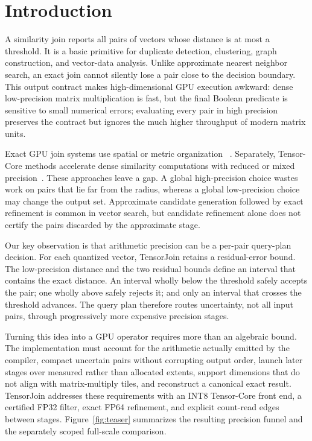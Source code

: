 \documentclass[sigconf,review,anonymous]{acmart}
\newcommand{\system}{TensorJoin\xspace}
\begin{document}
\section{Introduction}

A similarity join reports all pairs of vectors whose distance is at most a
threshold.  It is a basic primitive for duplicate detection, clustering,
graph construction, and vector-data analysis.  Unlike approximate nearest
neighbor search, an exact join cannot silently lose a pair close to the
decision boundary.  This output contract makes high-dimensional GPU execution
awkward: dense low-precision matrix multiplication is fast, but the final
Boolean predicate is sensitive to small numerical errors; evaluating every
pair in high precision preserves the contract but ignores the much higher
throughput of modern matrix units.

Exact GPU join systems use spatial or metric organization
~\cite{gowanlock2019gpuselfjoin,donnelly2024mistic}.  Separately, Tensor-Core
methods accelerate dense similarity computations with reduced or mixed
precision~\cite{ahle2020tensorcore,gallet2022distance,curless2025fasted}.
These approaches leave a gap.  A global high-precision choice wastes work on
pairs that lie far from the radius, whereas a global low-precision choice may
change the output set.  Approximate candidate generation followed by exact
refinement is common in vector search, but candidate refinement alone does not
certify the pairs discarded by the approximate stage.

Our key observation is that arithmetic precision can be a per-pair query-plan
decision.  For each quantized vector, \system retains a residual-error bound.
The low-precision distance and the two residual bounds define an interval that
contains the exact distance.  An interval wholly below the threshold safely
accepts the pair; one wholly above safely rejects it; and only an interval that
crosses the threshold advances.  The query plan therefore routes uncertainty,
not all input pairs, through progressively more expensive precision stages.

Turning this idea into a GPU operator requires more than an algebraic bound.
The implementation must account for the arithmetic actually emitted by the
compiler, compact uncertain pairs without corrupting output order, launch later
stages over measured rather than allocated extents, support dimensions that do
not align with matrix-multiply tiles, and reconstruct a canonical exact result.
\system addresses these requirements with an INT8 Tensor-Core front end, a
certified FP32 filter, exact FP64 refinement, and explicit count-read edges
between stages.  Figure~\ref{fig:teaser} summarizes the resulting precision
funnel and the separately scoped full-scale comparison.
\end{document}
